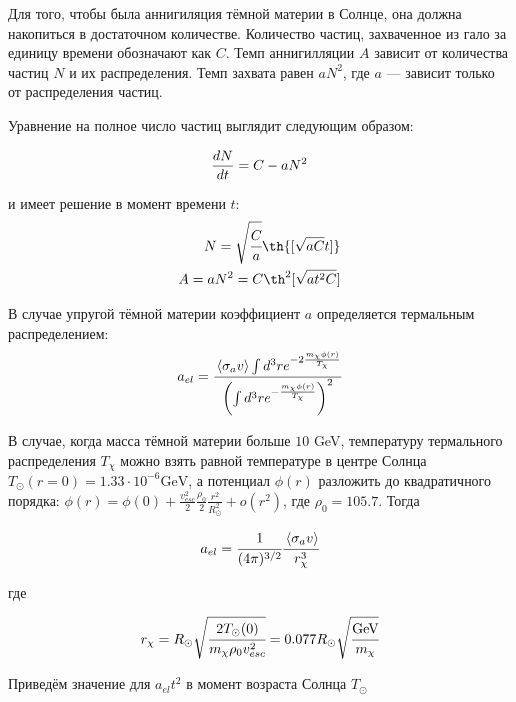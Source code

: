 Для того, чтобы была аннигиляция тёмной материи в Солнце, она должна накопиться в достаточном количестве. Количество частиц, захваченное из гало за единицу времени обозначают как $C$. Темп аннигилляции $A$ зависит от количества частиц $N$ и их распределения. Темп захвата равен $aN^2$, где $a$ --- зависит только от распределения частиц. 

Уравнение на полное число частиц выглядит следующим образом:

\begin{equation}
	\label{eq:Balance}
	\frac{d N}{d t} = C - aN^2
\end{equation}

\noindent и имеет решение в момент времени $t$:
\begin{equation}
\begin{split}
	N = \sqrt{\cfrac{C}{a}} \th{[\sqrt{aC}t]} \\
	A = aN^2 = C \th^2{[\sqrt{at^2C}]}
	\label{eq:AnnNtherm}
\end{split}
\end{equation}
	

В случае упругой тёмной материи коэффициент $a$ определяется термальным распределением:
\begin{equation}
	a_{el} = \cfrac{
		\left\langle \sigma_{a}v \right\rangle \int{d^3 r e^{-2 \frac{m_{\chi}\phi(r)}{T_{\chi}} }}
	}{\left(
		\int{d^3 r e^{- \frac{m_{\chi}\phi(r)}{T_{\chi}} }}
	\right)^2}
\end{equation}

В случае, когда масса тёмной материи больше $10$ GeV, температуру термального распределения $T_{\chi}$ можно взять равной температуре в центре Солнца $T_{\odot}(r=0) = 1.33\cdot10^{-6} \text{GeV}$, а потенциал $\phi(r)$ разложить до квадратичного порядка: $\phi(r) =\phi(0)+ \frac{v_{esc}^2}{2} \frac{\rho_0}{2} \frac{r^2}{R_{\odot}^2} + o(r^2)$,  где $\rho_0 = 105.7$. Тогда

\begin{equation}
	a_{el} = \cfrac{1}{(4\pi)^{3/2}} \cfrac{\left\langle \sigma_{a}v \right\rangle}{ r_{\chi}^3 }
\end{equation}

где

\begin{equation}
	r_{\chi} = R_{\odot} \sqrt{\cfrac{2 T_{\odot}(0) }{m_{\chi}\rho_0 v_{esc}^2}} =  0.077 R_{\odot} \sqrt{\cfrac{ \text{GeV}}{m_{\chi}}}
\end{equation}

Приведём значение для $a_{el}t^2$ в момент возраста Солнца $T_{\odot}$


